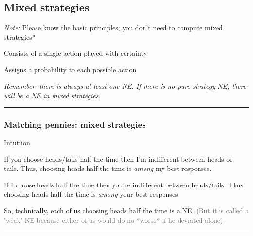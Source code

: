 \documentclass[]{article}
\providecommand{\tightlist}{%
  \setlength{\itemsep}{0pt}\setlength{\parskip}{0pt}}
\begin{document}
\hypertarget{mixed-strategies}{%
\subsection{Mixed strategies}\label{mixed-strategies}}

\emph{Note:} Please know the basic principles; you don't need to
\underline{compute} mixed strategies*

\begin{description}
\tightlist
\item[Pure strategy]
Consists of a single action played with certainty
\end{description}

\bigskip

\begin{description}
\tightlist
\item[Mixed strategy]
Assigns a probability to each possible action
\end{description}

\bigskip

\emph{Remember: there is always at least one NE. If there is no pure
strategy NE, there will be a NE in mixed strategies.}

\begin{center}\rule{0.5\linewidth}{\linethickness}\end{center}

\hypertarget{matching-pennies-mixed-strategies}{%
\subsubsection{Matching pennies: mixed
strategies}\label{matching-pennies-mixed-strategies}}

\underline{Intuition}

If you choose heads/tails half the time then I'm indifferent between
heads or tails. Thus, choosing heads half the time is \emph{among} my
best responses.

If I choose heads half the time then you're indifferent between
heads/tails. Thus choosing heads half the time is \emph{among} your best
responses

So, technically, each of us choosing heads half the time is a NE.
\textcolor{gray}{(But it is called a 'weak' NE because either of us would do no *worse* if he deviated alone)}

\begin{center}\rule{0.5\linewidth}{\linethickness}\end{center}
\end{document}
